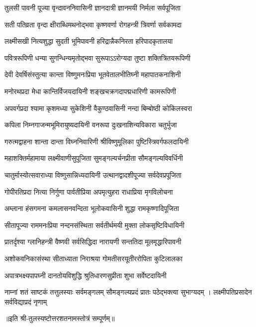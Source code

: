 


{तुलसी पावनी पूज्या वृन्दावननिवासिनी}
{ज्ञानदात्री ज्ञानमयी निर्मला सर्वपूजिता}%

\twolineshloka
{सती पतिव्रता वृन्दा क्षीराब्धिमथनोद्भवा}
{कृष्णवर्णा रोगहन्त्री त्रिवर्णा सर्वकामदा}%

\twolineshloka
{लक्ष्मीसखी नित्यशुद्धा सुदती भूमिपावनी}
{हरिद्रान्नैकनिरता हरिपादकृतालया}%

\twolineshloka
{पवित्ररूपिणी धन्या सुगन्धिन्यमृतोद्भवा}
{सुरूपाऽऽरोग्यदा तुष्टा शक्तित्रितयरूपिणी}%

\twolineshloka
{देवी देवर्षिसंस्तुत्या कान्ता विष्णुमनःप्रिया}
{भूतवेतालभीतिघ्नी महापातकनाशिनी}%

\twolineshloka
{मनोरथप्रदा मेधा कान्तिर्विजयदायिनी}
{शङ्खचक्रगदापद्मधारिणी कामरूपिणी}%

\twolineshloka
{अपवर्गप्रदा श्यामा कृशमध्या सुकेशिनी}
{वैकुण्ठवासिनी नन्दा बिम्बोष्ठी कोकिलस्वरा}%

\twolineshloka
{कपिला निम्नगाजन्मभूमिरायुष्यदायिनी}
{वनरूपा दुःखनाशिन्यविकारा चतुर्भुजा}%

\twolineshloka
{गरुत्मद्वाहना शान्ता दान्ता विघ्ननिवारिणी}
{श्रीविष्णुमूलिका पुष्टिस्त्रिवर्गफलदायिनी}%

\twolineshloka
{महाशक्तिर्महामाया लक्ष्मीवाणीसुपूजिता}
{सुमङ्गल्यर्चनप्रीता सौमङ्गल्यविवर्धिनी}%

\twolineshloka
{चातुर्मास्योत्सवाराध्या विष्णुसान्निध्यदायिनी}
{उत्थानद्वादशीपूज्या सर्वदेवप्रपूजिता}%

\twolineshloka
{गोपीरतिप्रदा नित्या निर्गुणा पार्वतीप्रिया}
{अपमृत्युहरा राधाप्रिया मृगविलोचना}%

\twolineshloka
{अम्लाना हंसगमना कमलासनवन्दिता}
{भूलोकवासिनी शुद्धा रामकृष्णादिपूजिता}%

\twolineshloka
{सीतापूज्या राममनःप्रिया नन्दनसंस्थिता}
{सर्वतीर्थमयी मुक्ता लोकसृष्टिविधायिनी}%

\twolineshloka
{प्रातर्दृश्या ग्लानिहन्त्री वैष्णवी सर्वसिद्धिदा}
{नारायणी सन्ततिदा मूलमृद्धारिपावनी}%

\twolineshloka
{अशोकवनिकासंस्था सीताध्याता निराश्रया}
{गोमतीसरयूतीररोपिता कुटिलालका}%

\twolineshloka
{अपात्रभक्ष्यपापघ्नी दानतोयविशुद्धि}
{श्रुतिधारणसुप्रीता शुभा सर्वेष्टदायिनी}%

\threelineshloka
{नाम्नां शतं साष्टकं तत्तुलस्याः सर्वमङ्गलम्}
{सौमङ्गल्यप्रदं प्रातः पठेद्भक्त्या सुभाग्यदम्} ।
{लक्ष्मीपतिप्रसादेन सर्वविद्याप्रदं नृणाम्}%

{॥इति श्री-तुलस्यष्टोत्तरशतनामस्तोत्रं सम्पूर्णम्॥}